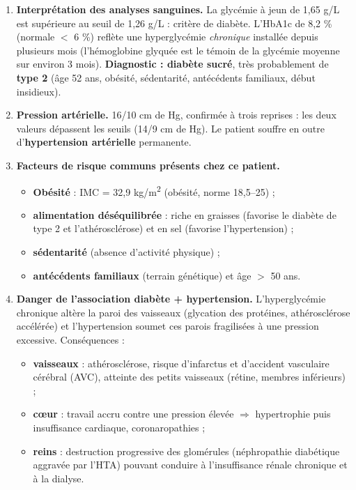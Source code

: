 \documentclass[11pt]{article}
\begin{document}
\begin{corrige}
\begin{enumerate}
\item \textbf{Interprétation des analyses sanguines.} La glycémie à jeun de 1,65 g/L est supérieure au seuil de 1,26 g/L : critère de diabète. L'HbA1c de 8,2 \% (normale $<$ 6 \%) reflète une hyperglycémie \emph{chronique} installée depuis plusieurs mois (l'hémoglobine glyquée est le témoin de la glycémie moyenne sur environ 3 mois). \textbf{Diagnostic : diabète sucré}, très probablement de \textbf{type 2} (âge 52 ans, obésité, sédentarité, antécédents familiaux, début insidieux).
\item \textbf{Pression artérielle.} 16/10 cm de Hg, confirmée à trois reprises : les deux valeurs dépassent les seuils (14/9 cm de Hg). Le patient souffre en outre d'\textbf{hypertension artérielle} permanente.
\item \textbf{Facteurs de risque communs présents chez ce patient.}
\begin{itemize}
\item \textbf{Obésité} : IMC = 32,9 kg/m\textsuperscript{2} (obésité, norme 18,5--25) ;
\item \textbf{alimentation déséquilibrée} : riche en graisses (favorise le diabète de type 2 et l'athérosclérose) et en sel (favorise l'hypertension) ;
\item \textbf{sédentarité} (absence d'activité physique) ;
\item \textbf{antécédents familiaux} (terrain génétique) et âge $>$ 50 ans.
\end{itemize}
\item \textbf{Danger de l'association diabète + hypertension.} L'hyperglycémie chronique altère la paroi des vaisseaux (glycation des protéines, athérosclérose accélérée) et l'hypertension soumet ces parois fragilisées à une pression excessive. Conséquences :
\begin{itemize}
\item \textbf{vaisseaux} : athérosclérose, risque d'infarctus et d'accident vasculaire cérébral (AVC), atteinte des petits vaisseaux (rétine, membres inférieurs) ;
\item \textbf{cœur} : travail accru contre une pression élevée $\Rightarrow$ hypertrophie puis insuffisance cardiaque, coronaropathies ;
\item \textbf{reins} : destruction progressive des glomérules (néphropathie diabétique aggravée par l'HTA) pouvant conduire à l'insuffisance rénale chronique et à la dialyse.

\end{itemize}
\end{enumerate}
\end{corrige}
\end{document}
